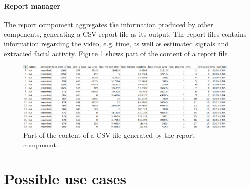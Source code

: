 \paragraph{Report manager}

The report compoment aggregates the information produced by other components, generating a CSV report file as its output. The report files contains information regarding the video, e.g. time, as well as estimated signals and extracted facial activity. Figure \ref{fig:tool-ui-report-csv} shows part of the content of a report file.

\begin{figure}[h]
    \centering
    \includegraphics[width=\textwidth]{figures/tool-ui-report-csv.png}
    \caption{Part of the content of a CSV file generated by the report component.}
    \label{fig:tool-ui-report-csv}
\end{figure}

\section{Possible use cases}




